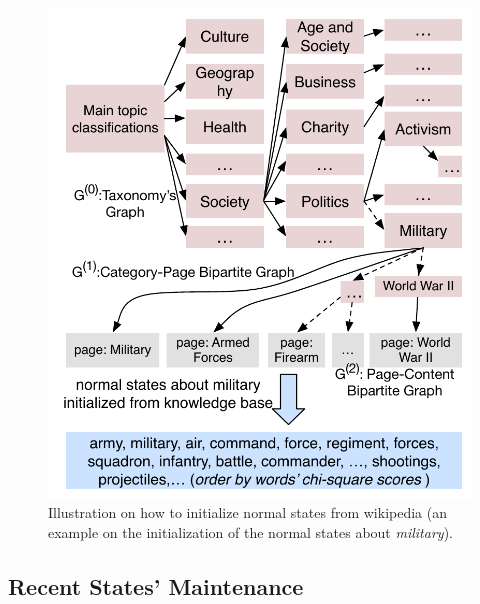 \documentclass[conference,compsoc]{IEEEtran}
\begin{document}

\begin{figure}
    \centering
    \includegraphics[width=.85\columnwidth]{img/initializationExample.pdf}  
    \caption{Illustration on how to initialize normal states from wikipedia (an example on the initialization of the normal states about \textit{military}).}
    \label{fig:NSinitializaton}
\end{figure}




\subsection{Recent States' Maintenance}
\label{subsec:rs_initialization}

\end{document}
